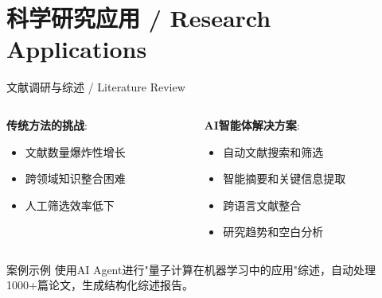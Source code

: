 \documentclass[aspectratio=169]{beamer}
\begin{document}
\section{科学研究应用 / Research Applications}

\begin{frame}{文献调研与综述 / Literature Review}
\begin{columns}
\begin{column}{0.5\textwidth}
\textbf{传统方法的挑战}:
\begin{itemize}
    \item 文献数量爆炸性增长
    \item 跨领域知识整合困难
    \item 人工筛选效率低下
\end{itemize}
\end{column}
\begin{column}{0.5\textwidth}
\textbf{AI智能体解决方案}:
\begin{itemize}
    \item 自动文献搜索和筛选
    \item 智能摘要和关键信息提取
    \item 跨语言文献整合
    \item 研究趋势和空白分析
\end{itemize}
\end{column}
\end{columns}

\vspace{1em}
\begin{block}{案例示例}
使用AI Agent进行"量子计算在机器学习中的应用"综述，自动处理1000+篇论文，生成结构化综述报告。
\end{block}
\end{frame}
\end{document}
